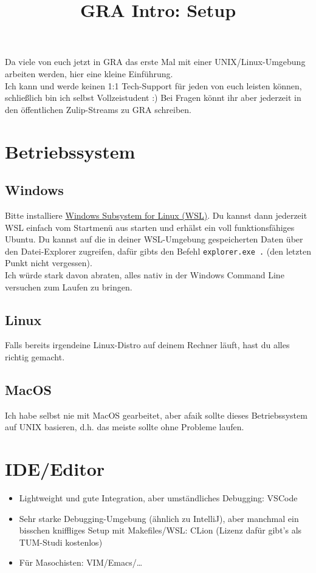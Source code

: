 \documentclass{article}
\title{\vspace{-4cm}GRA Intro: Setup}
\date{}
\author{}
\begin{document}
\maketitle
\vspace{-1.5cm}

Da viele von euch jetzt in GRA das erste Mal mit 
einer UNIX/Linux-Umgebung arbeiten werden, hier eine kleine Einführung.\\ Ich kann und werde keinen 1:1 Tech-Support für jeden von euch leisten
können, schließlich bin ich selbst Vollzeistudent :) Bei Fragen könnt ihr aber jederzeit in den öffentlichen Zulip-Streams zu 
GRA schreiben.

\section{Betriebssystem}
    \subsection{Windows}
    Bitte installiere \href{https://learn.microsoft.com/de-de/windows/wsl/install}{Windows Subsystem for Linux (WSL)}.
    Du kannst dann jederzeit WSL einfach vom Startmenü aus starten und erhälst ein voll funktionsfähiges Ubuntu.
    Du kannst auf die in deiner WSL-Umgebung gespeicherten Daten über den Datei-Explorer zugreifen, dafür gibts den Befehl
    \verb|explorer.exe .| (den letzten Punkt nicht vergessen).\\
    Ich würde stark davon abraten, alles nativ in der Windows Command Line versuchen zum Laufen zu bringen.
    \subsection{Linux}
    Falls bereits irgendeine Linux-Distro auf deinem Rechner läuft, hast du alles
    richtig gemacht.
    \subsection{MacOS}
    Ich habe selbst nie mit MacOS gearbeitet, aber afaik sollte dieses Betriebssystem
    auf UNIX basieren, d.h. das meiste sollte ohne Probleme laufen.
\section{IDE/Editor}
\begin{itemize}
    \item Lightweight und gute Integration, aber umständliches Debugging: VSCode
    \item Sehr starke Debugging-Umgebung (ähnlich zu IntelliJ), aber manchmal ein bisschen kniffliges Setup mit Makefiles/WSL: CLion (Lizenz dafür gibt's als TUM-Studi kostenlos)
    \item Für Masochisten: VIM/Emacs/\ldots
\end{itemize}
\end{document}

